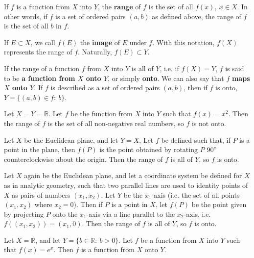 \documentclass[12pt]{article}
\begin{document}
\begin{defn}
  If $f$ is a function from $X$ into $Y$, the \textbf{range} of $f$ is the set of all
  $f(x),\ x \in X$. In other words, if $f$ is a set of ordered pairs $(a,b)$ as
  defined above, the range of $f$ is the set of all $b$ in $f$.

  If $E \subset X$, we call $f(E)$ the \textbf{image} of $E$ under $f$. With this
  notation, $f(X)$ represents the range of $f$. Naturally, $f(E) \subset Y$.
\end{defn}

\begin{defn}
  If the range of a function $f$ from $X$ into $Y$ is all of $Y$, i.e. if $f(X) = Y$,
  $f$ is said to be \textbf{a function from $X$ onto $Y$}, or simply \textbf{onto}.
  We can also say that $f$ \textbf{maps $X$ onto $Y$}. If $f$ is described as a set
  of ordered pairs $(a,b)$, then if $f$ is onto, $Y = \{(a,b) \in f:\ b\}$.
\end{defn}

\begin{exm}
  Let $X = Y = \mathbb{R}$. Let $f$ be the function from $X$ into $Y$ such that $f(x)
  = x^2$. Then the range of $f$ is the set of all non-negative real numbers, so $f$
  is not onto.
\end{exm}

\begin{exm}
  Let $X$ be the Euclidean plane, and let $Y = X$. Let $f$ be defined such that, if
  $P$ is a point in the plane, then $f(P)$ is the point obtained by rotating $P$
  $90\degree$ counterclockwise about the origin. Then the range of $f$ is all of $Y$,
  so $f$ is onto.
\end{exm}

\begin{exm}
  Let $X$ again be the Euclidean plane, and let a coordinate system be defined for
  $X$ as in analytic geometry, such that two parallel lines are used to identity
  points of $X$ as pairs of numbers $(x_1,x_2)$. Let $Y$ be the $x_1$-axis (i.e. the
  set of all points $(x_1,x_2)$ where $x_2 = 0$). Then if $P$ is a point in $X$, let
  $f(P)$ be the point given by projecting $P$ onto the $x_1$-axis via a line parallel
  to the $x_2$-axis, i.e. $f((x_1,x_2)) = (x_1,0)$. Then the range of $f$ is all of
  $Y$, so $f$ is onto.
\end{exm}

\begin{exm}
  Let $X = \mathbb{R}$, and let $Y = \{b \in \mathbb{R}:\ b > 0\}$. Let $f$ be a
  function from $X$ into $Y$ such that $f(x) = e^x$. Then $f$ is a function from $X$
  onto $Y$.
\end{exm}
\end{document}
